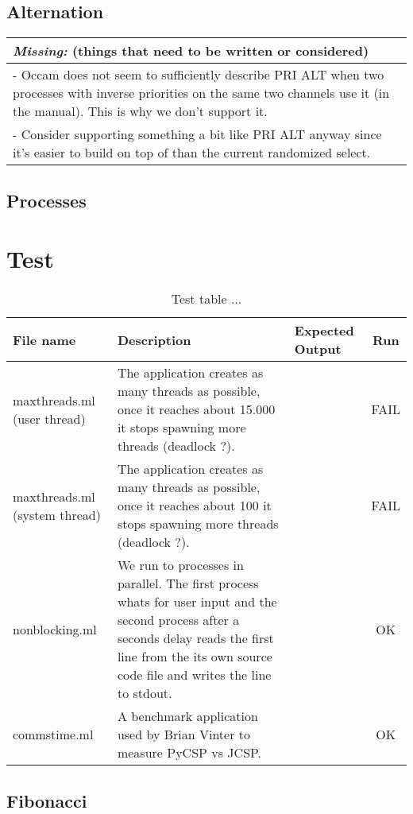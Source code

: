 \documentclass[a4paper,12pt]{article}
\newcommand{\missing}[1]{
\begin{tabular}{|p{11cm}|}
\hline
\emph{Missing:} {\scriptsize (things that need to be written or considered)} \\
\hline
#1
\hline
\end{tabular}
}
\begin{document}
\subsection{Alternation}

\missing{
- Occam does not seem to sufficiently describe PRI ALT when two processes with inverse priorities
on the same two channels use it (in the manual). This is why we don't support it. \\
- Consider supporting something a bit like PRI ALT anyway since it's easier to build on top of
than the current randomized select. \\
}

\subsection{Processes}

\section{Test}

\label{test}
\begin{table}[!ht]
\centering
\begin{tabular}{|p{3cm}|p{4.0cm}|p{4.0cm}|c|}
    \hline
    	File name &
	Description &
	Expected Output &
	Run \\
    \hline
    	maxthreads.ml (user thread) &
        The application creates as many threads as possible, once it reaches
        about 15.000 it stops spawning more threads (deadlock ?).&
        &
	FAIL \\
    \hline
    	maxthreads.ml (system thread) &
        The application creates as many threads as possible, once it reaches
        about 100 it stops spawning more threads (deadlock ?).&
        &
	FAIL \\
    \hline
    	nonblocking.ml &
        We run to processes in parallel. The first process whats for user input
        and the second process after a seconds delay reads the first line from
        the its own source code file and writes the line to stdout.&
        &
	OK \\
    \hline
    	commstime.ml &
        A benchmark application used by Brian Vinter to measure PyCSP vs JCSP.&
        &
	OK \\
    \hline
\end{tabular} 
\caption{Test table ...}
\label{testtable}
\end{table}

\subsection{Fibonacci}
\end{document}
